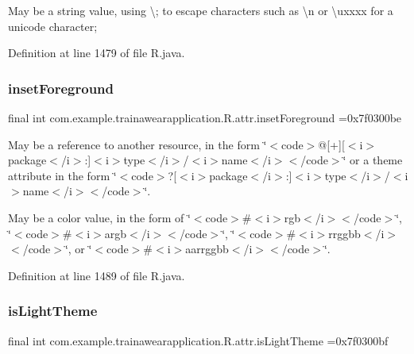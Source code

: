 May be a string value, using \textquotesingle{}\textbackslash{};\textquotesingle{} to escape characters such as \textquotesingle{}\textbackslash{}n\textquotesingle{} or \textquotesingle{}\textbackslash{}uxxxx\textquotesingle{} for a unicode character; 

Definition at line 1479 of file R.\+java.

\mbox{\label{classcom_1_1example_1_1trainawearapplication_1_1_r_1_1attr_a8897a08b00504b9242fc799e0e53c48e}} 
\subsubsection{\texorpdfstring{insetForeground}{insetForeground}}
{\footnotesize\ttfamily final int com.\+example.\+trainawearapplication.\+R.\+attr.\+inset\+Foreground =0x7f0300be\hspace{0.3cm}{\ttfamily [static]}}

May be a reference to another resource, in the form \char`\"{}$<$code$>$@\mbox{[}+\mbox{]}\mbox{[}$<$i$>$package$<$/i$>$\+:\mbox{]}$<$i$>$type$<$/i$>$/$<$i$>$name$<$/i$>$$<$/code$>$\char`\"{} or a theme attribute in the form \char`\"{}$<$code$>$?\mbox{[}$<$i$>$package$<$/i$>$\+:\mbox{]}$<$i$>$type$<$/i$>$/$<$i$>$name$<$/i$>$$<$/code$>$\char`\"{}. 

May be a color value, in the form of \char`\"{}$<$code$>$\#$<$i$>$rgb$<$/i$>$$<$/code$>$\char`\"{}, \char`\"{}$<$code$>$\#$<$i$>$argb$<$/i$>$$<$/code$>$\char`\"{}, \char`\"{}$<$code$>$\#$<$i$>$rrggbb$<$/i$>$$<$/code$>$\char`\"{}, or \char`\"{}$<$code$>$\#$<$i$>$aarrggbb$<$/i$>$$<$/code$>$\char`\"{}. 

Definition at line 1489 of file R.\+java.

\mbox{\label{classcom_1_1example_1_1trainawearapplication_1_1_r_1_1attr_a0022e702c6ffefa6c69963eed311437e}} 
\subsubsection{\texorpdfstring{isLightTheme}{isLightTheme}}
{\footnotesize\ttfamily final int com.\+example.\+trainawearapplication.\+R.\+attr.\+is\+Light\+Theme =0x7f0300bf\hspace{0.3cm}{\ttfamily [static]}}

